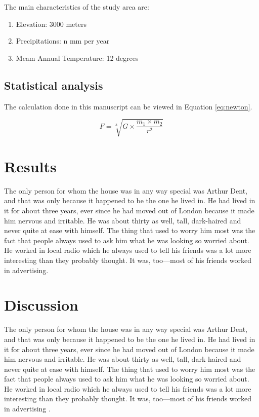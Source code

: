 \noindent The main characteristics of the study area are:
\begin{enumerate}
    \item Elevation: 3000 meters
    \item Precipitations: n mm per year
    \item Meam Annual Temperature: 12 degrees
\end{enumerate}

\subsection{Statistical analysis}
The calculation done in this manuscript can be viewed in Equation \ref{eq:newton}.

\begin{equation}
    F = \sqrt[3]{G \times \frac{m_1 \times m_2}{r^2}}
    \label{eq:newton}
\end{equation}


\section{Results}

The only person for whom the house was in any way special was Arthur Dent, and that was only because it happened to be the one he lived in. He had lived in it for about three years, ever since he had moved out of London because it made him nervous and irritable. He was about thirty as well, tall, dark-haired and never quite at ease with himself. The thing that used to worry him most was the fact that people always used to ask him what he was looking so worried about. He worked in local radio which he always used to tell his friends was a lot more interesting than they probably thought. It was, too—most of his friends worked in advertising.


\section{Discussion}
The only person for whom the house was in any way special was Arthur Dent, and that was only because it happened to be the one he lived in. He had lived in it for about three years, ever since he had moved out of London because it made him nervous and irritable. He was about thirty as well, tall, dark-haired and never quite at ease with himself. The thing that used to worry him most was the fact that people always used to ask him what he was looking so worried about. He worked in local radio which he always used to tell his friends was a lot more interesting than they probably thought. It was, too—most of his friends worked in advertising \citep{yoccoz2001}.

